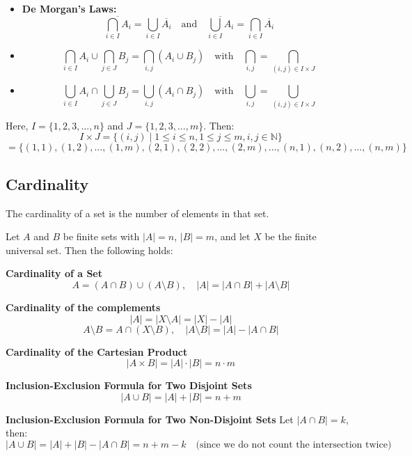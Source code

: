 \begin{itemize}[label=$-$]


	\item\textbf{De Morgan's Laws:}
	\[
		\overline{\bigcap_{i \in I} A_i}= \bigcup_{i \in I} \overline{A_i} \quad \text{and} \quad \overline{\bigcup_{i \in I} A_i} = \bigcap_{i \in I} \overline{A_i}
	\]

	\item\[
		\bigcap_{i \in I} A_i \cup \bigcap_{j \in J} B_j = \bigcap_{i,j} (A_i \cup B_j) \quad \text{with} \quad \bigcap_{i,j} = \bigcap_{(i,j) \in I \times J}
	\]


	\item\[
		\bigcup_{i \in I} A_i \cap \bigcup_{j \in J} B_j = \bigcup_{i,j} (A_i \cap B_j) \quad \text{with} \quad \bigcup_{i,j} = \bigcup_{(i,j) \in I \times J}
	\]

\end{itemize}
Here, \( I = \{ 1, 2, 3, \dots, n \} \) and \( J = \{ 1, 2, 3, \dots, m \} \). Then:
\[
	I \times J = \{ (i, j) \mid 1 \leq i \leq n, 1 \leq j \leq m, i, j \in \mathbb{N} \}
\]
\[
	= \{ (1, 1), (1, 2), \dots, (1, m), (2, 1), (2, 2), \dots, (2, m), \dots, (n, 1), (n, 2), \dots, (n, m) \}
\]

\subsection{Cardinality}
The cardinality of a set is the number of elements in that set.

Let \( A \) and \( B \) be finite sets with \( |A| = n \), \( |B| = m \), and let \( X \) be the finite universal set. Then the following holds:

\textbf{Cardinality of a Set}
\[
	A = (A \cap B) \cup (A \setminus B), \quad |A| = |A \cap B| + |A \setminus B|
\]

\textbf{Cardinality of the complements}
\[
	|A| = |X \setminus A| = |X| - |A|
\]
\[
	A \setminus B = A \cap (X \setminus B), \quad |A \setminus B| = |A| - |A \cap B|
\]

\textbf{Cardinality of the Cartesian Product}
\[
	|A \times B| = |A| \cdot |B| = n \cdot m
\]

\textbf{Inclusion-Exclusion Formula for Two Disjoint Sets}
\[
	|A \cup B| = |A| + |B| = n + m
\]

\textbf{Inclusion-Exclusion Formula for Two Non-Disjoint Sets}
Let \( |A \cap B| = k \), then:
\[
	|A \cup B| = |A| + |B| - |A \cap B| = n + m - k \quad \text{(since we do not count the intersection twice)}
\]

